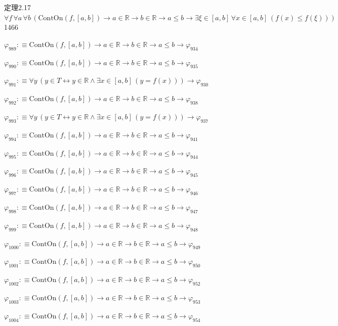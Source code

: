 \begin{fullproof}{定理2.17}{$\forall f\,\forall a\,\forall b\,(\mathrm{ContOn}(f,[a,b]) \to a \in \mathbb{R} \to b \in \mathbb{R} \to a \leq b \to \exists \xi \in [a,b]\,\forall x \in [a,b]\,(f(x) \leq f(\xi)))$}{1466}
\begin{abbrevlist}
\item $\varphi_{989} :\equiv \mathrm{ContOn}(f,[a,b]) \to a \in \mathbb{R} \to b \in \mathbb{R} \to a \leq b \to \varphi_{934}$
\item $\varphi_{990} :\equiv \mathrm{ContOn}(f,[a,b]) \to a \in \mathbb{R} \to b \in \mathbb{R} \to a \leq b \to \varphi_{935}$
\item $\varphi_{991} :\equiv \forall y\,(y \in T \leftrightarrow y \in \mathbb{R} \land \exists x \in [a,b]\,(y = f(x))) \to \varphi_{930}$
\item $\varphi_{992} :\equiv \mathrm{ContOn}(f,[a,b]) \to a \in \mathbb{R} \to b \in \mathbb{R} \to a \leq b \to \varphi_{938}$
\item $\varphi_{993} :\equiv \forall y\,(y \in T \leftrightarrow y \in \mathbb{R} \land \exists x \in [a,b]\,(y = f(x))) \to \varphi_{937}$
\item $\varphi_{994} :\equiv \mathrm{ContOn}(f,[a,b]) \to a \in \mathbb{R} \to b \in \mathbb{R} \to a \leq b \to \varphi_{941}$
\item $\varphi_{995} :\equiv \mathrm{ContOn}(f,[a,b]) \to a \in \mathbb{R} \to b \in \mathbb{R} \to a \leq b \to \varphi_{944}$
\item $\varphi_{996} :\equiv \mathrm{ContOn}(f,[a,b]) \to a \in \mathbb{R} \to b \in \mathbb{R} \to a \leq b \to \varphi_{945}$
\item $\varphi_{997} :\equiv \mathrm{ContOn}(f,[a,b]) \to a \in \mathbb{R} \to b \in \mathbb{R} \to a \leq b \to \varphi_{946}$
\item $\varphi_{998} :\equiv \mathrm{ContOn}(f,[a,b]) \to a \in \mathbb{R} \to b \in \mathbb{R} \to a \leq b \to \varphi_{947}$
\item $\varphi_{999} :\equiv \mathrm{ContOn}(f,[a,b]) \to a \in \mathbb{R} \to b \in \mathbb{R} \to a \leq b \to \varphi_{948}$
\item $\varphi_{1000} :\equiv \mathrm{ContOn}(f,[a,b]) \to a \in \mathbb{R} \to b \in \mathbb{R} \to a \leq b \to \varphi_{949}$
\item $\varphi_{1001} :\equiv \mathrm{ContOn}(f,[a,b]) \to a \in \mathbb{R} \to b \in \mathbb{R} \to a \leq b \to \varphi_{950}$
\item $\varphi_{1002} :\equiv \mathrm{ContOn}(f,[a,b]) \to a \in \mathbb{R} \to b \in \mathbb{R} \to a \leq b \to \varphi_{952}$
\item $\varphi_{1003} :\equiv \mathrm{ContOn}(f,[a,b]) \to a \in \mathbb{R} \to b \in \mathbb{R} \to a \leq b \to \varphi_{953}$
\item $\varphi_{1004} :\equiv \mathrm{ContOn}(f,[a,b]) \to a \in \mathbb{R} \to b \in \mathbb{R} \to a \leq b \to \varphi_{954}$

\end{abbrevlist}
\end{fullproof}
